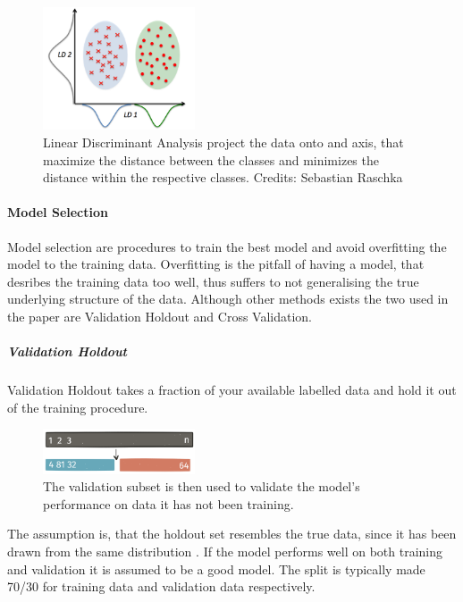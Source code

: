 \begin{figure}[H]
    \centering
    \includegraphics[width=0.4\textwidth]{figures/lda.png}
    \caption[]{Linear Discriminant Analysis project the data onto and axis, that maximize the distance between the classes and minimizes the distance within the respective classes. Credits: Sebastian Raschka}
    \label{fig:lda}
\end{figure}

\paragraph{Model Selection}

Model selection are procedures to train the best model and avoid overfitting the model to the training data. Overfitting is the pitfall of having a model, that desribes the training data too well, thus suffers to not generalising the true underlying structure of the data. Although other methods exists the two used in the paper are Validation Holdout and Cross Validation. 

\subparagraph{Validation Holdout}

Validation Holdout takes a fraction of your available labelled data and hold it out of the training procedure. 

\begin{figure}[H]
    \centering
    \includegraphics[width=0.4\textwidth]{figures/validationset.png}
    \caption[]{The validation subset is then used to validate the model's performance on data it has not been training.}
    \label{fig:val_holdout}
\end{figure}

The assumption is, that the holdout set resembles the true data, since it has been drawn from the same distribution \cite{Goodfellow-et-al-2016}. If the model performs well on both training and validation it is assumed to be a good model. The split is typically made 70/30 for training data and validation data respectively. 

